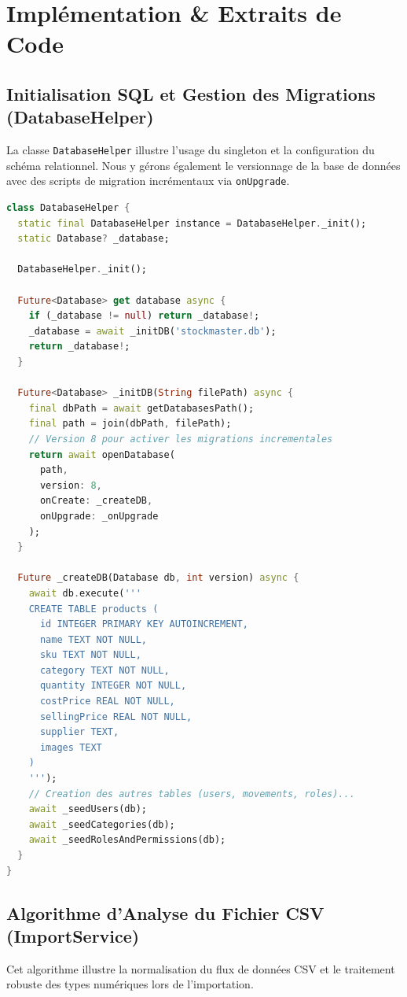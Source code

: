 \documentclass[12pt,a4paper]{report}
\begin{document}
\chapter{Implémentation \& Extraits de Code}

\section{Initialisation SQL et Gestion des Migrations (DatabaseHelper)}
La classe \texttt{DatabaseHelper} illustre l'usage du singleton et la configuration du schéma relationnel. Nous y gérons également le versionnage de la base de données avec des scripts de migration incrémentaux via \texttt{onUpgrade}.

\begin{lstlisting}[language=Dart, caption={Extrait de la classe DatabaseHelper}]
class DatabaseHelper {
  static final DatabaseHelper instance = DatabaseHelper._init();
  static Database? _database;

  DatabaseHelper._init();

  Future<Database> get database async {
    if (_database != null) return _database!;
    _database = await _initDB('stockmaster.db');
    return _database!;
  }

  Future<Database> _initDB(String filePath) async {
    final dbPath = await getDatabasesPath();
    final path = join(dbPath, filePath);
    // Version 8 pour activer les migrations incrementales
    return await openDatabase(
      path, 
      version: 8, 
      onCreate: _createDB, 
      onUpgrade: _onUpgrade
    );
  }

  Future _createDB(Database db, int version) async {
    await db.execute('''
    CREATE TABLE products (
      id INTEGER PRIMARY KEY AUTOINCREMENT,
      name TEXT NOT NULL,
      sku TEXT NOT NULL,
      category TEXT NOT NULL,
      quantity INTEGER NOT NULL,
      costPrice REAL NOT NULL,
      sellingPrice REAL NOT NULL,
      supplier TEXT,
      images TEXT
    )
    ''');
    // Creation des autres tables (users, movements, roles)...
    await _seedUsers(db);
    await _seedCategories(db);
    await _seedRolesAndPermissions(db);
  }
}
\end{lstlisting}

\newpage

\section{Algorithme d'Analyse du Fichier CSV (ImportService)}
Cet algorithme illustre la normalisation du flux de données CSV et le traitement robuste des types numériques lors de l'importation.
\end{document}
